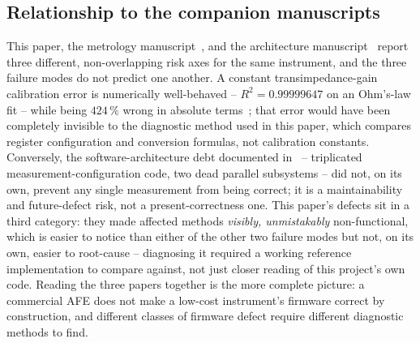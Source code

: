 \subsection{Relationship to the companion manuscripts}
This paper, the metrology manuscript~\cite{clement2026linearity}, and the
architecture manuscript~\cite{clement2026architecture} report three
different, non-overlapping risk axes for the same instrument, and the
three failure modes do not predict one another. A constant
transimpedance-gain calibration error is numerically well-behaved --
$R^2=0.99999647$ on an Ohm's-law fit -- while being $424\,\%$ wrong in
absolute terms~\cite{clement2026linearity}; that error would have been
completely invisible to the diagnostic method used in this
paper, which compares register configuration and conversion formulas, not
calibration constants. Conversely, the software-architecture debt
documented in~\cite{clement2026architecture} -- triplicated
measurement-configuration code, two dead parallel subsystems -- did not,
on its own, prevent any single measurement from being correct; it is a
maintainability and future-defect risk, not a present-correctness one.
This paper's defects sit in a third category: they made affected methods
\emph{visibly, unmistakably} non-functional, which is easier to notice
than either of the other two failure modes but not, on its own, easier to
root-cause -- diagnosing it required a working reference implementation to
compare against, not just closer reading of this project's own code.
Reading the three papers together is the more complete picture: a
commercial AFE does not make a low-cost instrument's firmware correct by
construction, and different classes of firmware defect require different
diagnostic methods to find.

